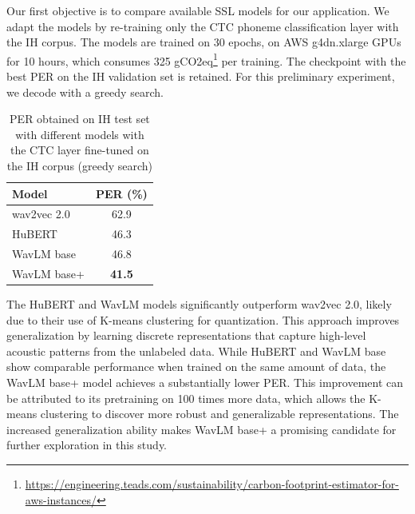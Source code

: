\documentclass{Interspeech2024}
\begin{document}
Our first objective is to compare available SSL models for our application. We adapt the models by re-training only the CTC phoneme classification layer with the IH corpus.
The models are trained on 30 epochs, on AWS g4dn.xlarge GPUs for 10 hours, which consumes 325 gCO2eq\footnote{\scriptsize\url{https://engineering.teads.com/sustainability/carbon-footprint-estimator-for-aws-instances/}} per training. The checkpoint with the best PER on the IH validation set is retained. For this preliminary experiment, we decode with a greedy search.

\vspace{-0.2cm}
\begin{table}[htbp]
  \caption{PER obtained on IH test set with different models with the CTC layer fine-tuned on the IH corpus (greedy search)}
  \label{tab:comparison}
  \centering
  \begin{tabular}{|l|c|}
    \hline
    \textbf{Model} & \textbf{PER (\%)} \\
    \hline
	wav2vec 2.0  & 62.9 \\
	HuBERT & 46.3\\
    WavLM base & 46.8 \\
    WavLM base+ & \textbf{41.5}\\
    \hline
  \end{tabular}
  \vspace{-0.3cm}
\end{table}


The HuBERT and WavLM models significantly outperform wav2vec 2.0, likely due to their use of K-means clustering for quantization. This approach improves generalization by learning discrete representations that capture high-level acoustic patterns from the unlabeled data. While HuBERT and WavLM base show comparable performance when trained on the same amount of data, the WavLM base+ model achieves a substantially lower PER. This improvement can be attributed to its pretraining on 100 times more data, which allows the K-means clustering to discover more robust and generalizable representations.
The increased generalization ability makes WavLM base+ a promising candidate for further exploration in this study.
\end{document}
